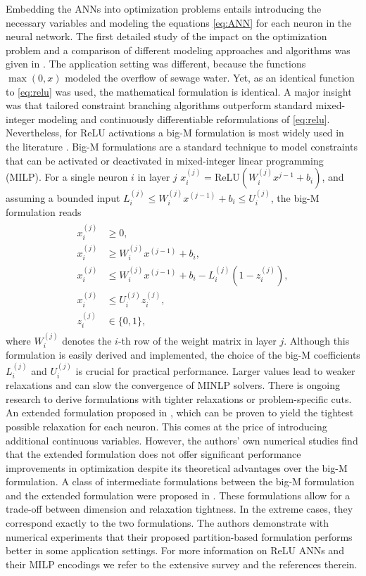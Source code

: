 Embedding the ANNs into optimization problems entails introducing the necessary variables and modeling the equations \eqref{eq:ANN} for each neuron in the neural network. 
%
The first detailed study of the impact on the optimization problem and a comparison of different modeling approaches and algorithms was given in \citet{Joseph-Duran2014}. The application setting was different, because the functions $\max(0, x)$ modeled the overflow of sewage water. Yet, as an identical function to \eqref{eq:relu} was used, the mathematical formulation is identical. A major insight was that tailored constraint branching algorithms outperform standard mixed-integer modeling and continuously differentiable reformulations of \eqref{eq:relu}.
%
Nevertheless, for ReLU activations a big-M formulation is most widely used in the literature \citep{Fischetti2018,Xiao2019,Tjeng2019}. Big-M formulations are a standard technique to model constraints that can be activated or deactivated in mixed-integer linear programming (MILP). For a single neuron $i$ in layer $j$ $x^{(j)}_i = \text{ReLU}(W^{(j)}_i x^{j-1} + b_i)$, and assuming a bounded input $L^{(j)}_i \leq W^{(j)}_i x^{(j-1)} + b_i\leq U^{(j)}_i$, the big-M formulation reads
\begin{align}
    \begin{split}
        x^{(j)}_i & \geq  0, \\
        x^{(j)}_i & \geq W^{(j)}_i x^{(j-1)} + b_i,\\
        x^{(j)}_i & \leq  W^{(j)}_i x^{(j-1)} + b_i - L^{(j)}_i (1-z_i^{(j)}), \\
        x^{(j)}_i & \leq U^{(j)}_i z_i^{(j)}, \\
        z^{(j)}_i & \in \{0,1\},
    \end{split}
    \label{eq:bigM}
\end{align}
where $W^{(j)}_i$ denotes the $i$-th row of the weight matrix in layer $j$. Although this formulation is easily derived and implemented, the choice of the big-M coefficients $L^{(j)}_i$ and $U^{(j)}_i$ is crucial for practical performance. Larger values lead to weaker relaxations and can slow the convergence of MINLP solvers.
There is ongoing research to derive formulations with tighter relaxations or problem-specific cuts. An extended formulation proposed in \citet{Anderson2020}, which can be proven to yield the tightest possible relaxation for each neuron. This comes at the price of introducing additional continuous variables. However, the authors' own numerical studies find that the extended formulation does not offer significant performance improvements in optimization despite its theoretical advantages over the big-M formulation. A class of intermediate formulations between the big-M formulation and the extended formulation were proposed in \citet{Tsay2021,Kronqvist2024}. These formulations allow for a trade-off between dimension and relaxation tightness. In the extreme cases, they correspond exactly to the two formulations. The authors demonstrate with numerical experiments that their proposed partition-based formulation performs better in some application settings. For more information on ReLU ANNs and their MILP encodings we refer to the extensive survey \citet{Huchette2023a} and the references therein.

